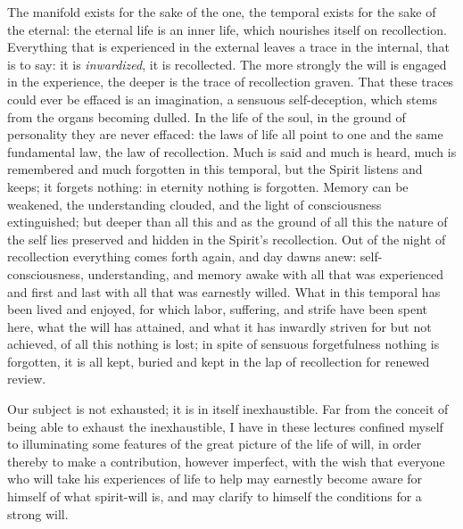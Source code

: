 \documentclass[12pt,a4paper,openany]{book}
\newcommand{\opage}[1]{\marginnote{\footnotesize\textit{[#1]}}}
\begin{document}
The manifold exists for the sake of the one, the
temporal exists for the sake of the eternal: the eternal life is an
inner life, which nourishes itself on recollection. Everything that
is experienced in the external leaves a trace in the internal,
that is to say: it is \emph{inwardized}, it is recollected. The
more strongly the will is engaged in the experience, the deeper is the
trace of recollection graven. That these traces could ever be effaced
is an imagination, a sensuous self-deception, which
stems from the organs becoming dulled. In the life of the soul, in the ground of personality
they are never effaced: the laws of life all point
to one and the same fundamental law, the law of recollection.
Much is said and much is heard, much is remembered and much
forgotten in this temporal, but the Spirit listens and keeps;
it forgets nothing: in eternity nothing is forgotten.
\setcounter{footnote}{0}%
\opage{83}Memory can be weakened, the understanding clouded, and the
light of consciousness extinguished; but deeper than all this and
as the ground of all this the nature of the self lies preserved and
hidden in the Spirit's recollection. Out of the night of recollection
everything comes forth again, and day dawns anew: self-consciousness,
understanding, and memory awake with all that was experienced
and first and last with all that was earnestly willed.
What in this temporal has been lived and enjoyed, for which labor,
suffering, and strife have been spent here, what the will has attained, and
what it has inwardly striven for but not achieved, of all
this nothing is lost; in spite of sensuous forgetfulness nothing
is forgotten, it is all kept, buried and kept
in the lap of recollection for renewed review.

Our subject is not exhausted; it is in itself
inexhaustible. Far from the conceit of being able to exhaust
the inexhaustible, I have in these lectures confined
myself to illuminating some features of the great picture of the life of will,
in order thereby to make a contribution, however imperfect,
with the wish that everyone who will take his experiences of life
to help may earnestly become aware for himself of what
spirit-will is, and may clarify to himself the conditions for a strong
will.
\end{document}
